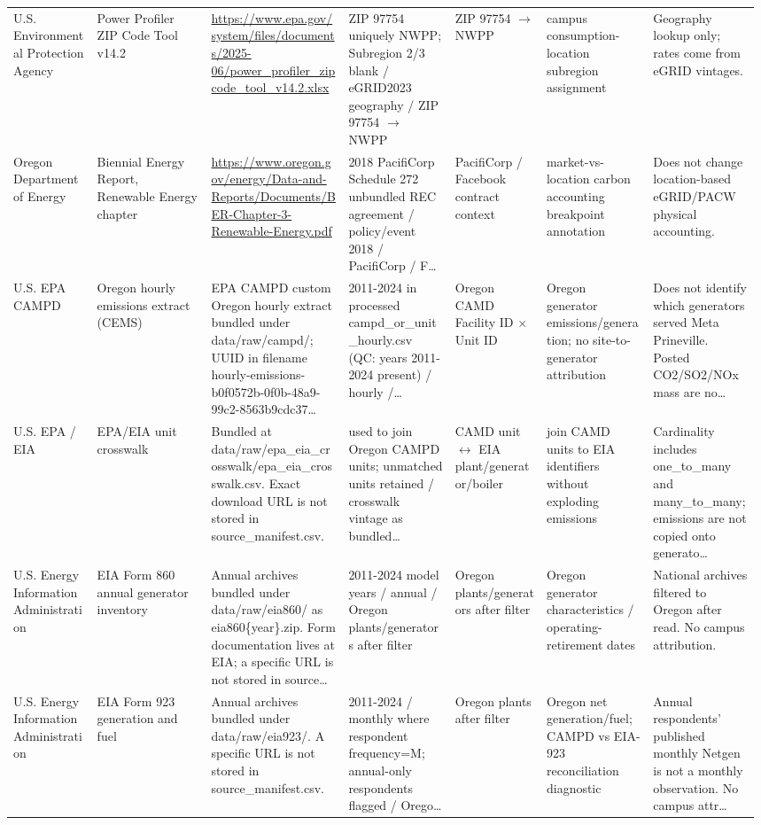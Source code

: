 \documentclass[11pt]{article}
\begin{document}
\begin{longtable}{@{}p{0.11\linewidth}p{0.15\linewidth}p{0.18\linewidth}p{0.14\linewidth}p{0.12\linewidth}p{0.14\linewidth}p{0.14\linewidth}@{}}
U.S. Environmental Protection Agency & Power Profiler ZIP Code Tool v14.2 & \url{https://www.epa.gov/system/files/documents/2025-06/power_profiler_zipcode_tool_v14.2.xlsx} & ZIP 97754 uniquely NWPP; Subregion 2/3 blank / eGRID2023 geography / ZIP 97754 $\to$ NWPP & ZIP 97754 $\to$ NWPP & campus consumption-location subregion assignment & Geography lookup only; rates come from eGRID vintages.\\
Oregon Department of Energy & Biennial Energy Report, Renewable Energy chapter & \url{https://www.oregon.gov/energy/Data-and-Reports/Documents/BER-Chapter-3-Renewable-Energy.pdf} & 2018 PacifiCorp Schedule 272 unbundled REC agreement / policy/event 2018 / PacifiCorp / F\ldots & PacifiCorp / Facebook contract context & market-vs-location carbon accounting breakpoint annotation & Does not change location-based eGRID/PACW physical accounting.\\
U.S. EPA CAMPD & Oregon hourly emissions extract (CEMS) & EPA CAMPD custom Oregon hourly extract bundled under data/raw/campd/; UUID in filename hourly-emissions-b0f0572b-0f0b-48a9-99c2-8563b9cdc37\ldots & 2011-2024 in processed campd\_or\_unit\_hourly.csv (QC: years 2011-2024 present) / hourly /\ldots & Oregon CAMD Facility ID $\times$ Unit ID & Oregon generator emissions/generation; no site-to-generator attribution & Does not identify which generators served Meta Prineville. Posted CO2/SO2/NOx mass are no\ldots\\
U.S. EPA / EIA & EPA/EIA unit crosswalk & Bundled at data/raw/epa\_eia\_crosswalk/epa\_eia\_crosswalk.csv. Exact download URL is not stored in source\_manifest.csv. & used to join Oregon CAMPD units; unmatched units retained / crosswalk vintage as bundled\ldots & CAMD unit $\leftrightarrow$ EIA plant/generator/boiler & join CAMD units to EIA identifiers without exploding emissions & Cardinality includes one\_to\_many and many\_to\_many; emissions are not copied onto generato\ldots\\
U.S. Energy Information Administration & EIA Form 860 annual generator inventory & Annual archives bundled under data/raw/eia860/ as eia860\{year\}.zip. Form documentation lives at EIA; a specific URL is not stored in source\ldots & 2011-2024 model years / annual / Oregon plants/generators after filter & Oregon plants/generators after filter & Oregon generator characteristics / operating-retirement dates & National archives filtered to Oregon after read. No campus attribution.\\
U.S. Energy Information Administration & EIA Form 923 generation and fuel & Annual archives bundled under data/raw/eia923/. A specific URL is not stored in source\_manifest.csv. & 2011-2024 / monthly where respondent frequency=M; annual-only respondents flagged / Orego\ldots & Oregon plants after filter & Oregon net generation/fuel; CAMPD vs EIA-923 reconciliation diagnostic & Annual respondents' published monthly Netgen is not a monthly observation. No campus attr\ldots\\

\end{longtable}
\end{document}
